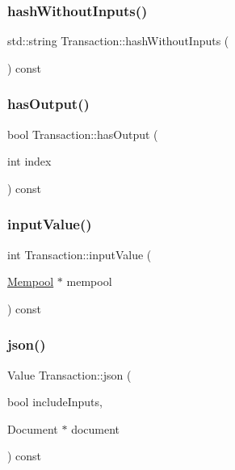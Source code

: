 \mbox{\label{classTransaction_a0f5aa15dc325b98730ba5eb786b0ffb2}} 
\subsubsection{\texorpdfstring{hash\+Without\+Inputs()}{hashWithoutInputs()}}
{\footnotesize\ttfamily std\+::string Transaction\+::hash\+Without\+Inputs (\begin{DoxyParamCaption}{ }\end{DoxyParamCaption}) const}

\mbox{\label{classTransaction_aa2248446ed0d06f64d1685c386189666}} 
\subsubsection{\texorpdfstring{has\+Output()}{hasOutput()}}
{\footnotesize\ttfamily bool Transaction\+::has\+Output (\begin{DoxyParamCaption}\item[{int}]{index }\end{DoxyParamCaption}) const}

\mbox{\label{classTransaction_abffdb9f040a484f89920842895d57ed2}} 
\subsubsection{\texorpdfstring{input\+Value()}{inputValue()}}
{\footnotesize\ttfamily int Transaction\+::input\+Value (\begin{DoxyParamCaption}\item[{\mbox{\hyperlink{classMempool}{Mempool}} $\ast$}]{mempool }\end{DoxyParamCaption}) const}

\mbox{\label{classTransaction_a41561665dfeef8f887fdc86f3c9849f8}} 
\subsubsection{\texorpdfstring{json()}{json()}}
{\footnotesize\ttfamily Value Transaction\+::json (\begin{DoxyParamCaption}\item[{bool}]{include\+Inputs,  }\item[{Document $\ast$}]{document }\end{DoxyParamCaption}) const}

